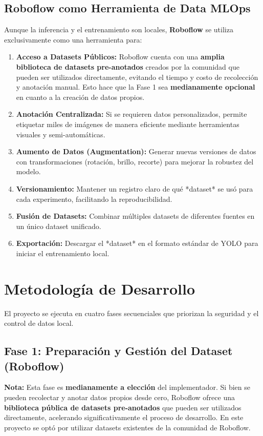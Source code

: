 \documentclass[12pt, a4paper]{article}
\begin{document}
\subsection{Roboflow como Herramienta de Data MLOps}
Aunque la inferencia y el entrenamiento son locales, \textbf{Roboflow} se utiliza exclusivamente como una herramienta para:
\begin{enumerate}
\item \textbf{Acceso a Datasets Públicos:} Roboflow cuenta con una \textbf{amplia biblioteca de datasets pre-anotados} creados por la comunidad que pueden ser utilizados directamente, evitando el tiempo y costo de recolección y anotación manual. Esto hace que la Fase 1 sea \textbf{medianamente opcional} en cuanto a la creación de datos propios.
\item \textbf{Anotación Centralizada:} Si se requieren datos personalizados, permite etiquetar miles de imágenes de manera eficiente mediante herramientas visuales y semi-automáticas.
\item \textbf{Aumento de Datos (Augmentation):} Generar nuevas versiones de datos con transformaciones (rotación, brillo, recorte) para mejorar la robustez del modelo.
\item \textbf{Versionamiento:} Mantener un registro claro de qué *dataset* se usó para cada experimento, facilitando la reproducibilidad.
\item \textbf{Fusión de Datasets:} Combinar múltiples datasets de diferentes fuentes en un único dataset unificado.
\item \textbf{Exportación:} Descargar el *dataset* en el formato estándar de YOLO para iniciar el entrenamiento local.
\end{enumerate}

\newpage

\section{Metodología de Desarrollo}

El proyecto se ejecuta en cuatro fases secuenciales que priorizan la seguridad y el control de datos local.

\subsection{Fase 1: Preparación y Gestión del Dataset (Roboflow)}

\textbf{Nota:} Esta fase es \textbf{medianamente a elección} del implementador. Si bien se pueden recolectar y anotar datos propios desde cero, Roboflow ofrece una \textbf{biblioteca pública de datasets pre-anotados} que pueden ser utilizados directamente, acelerando significativamente el proceso de desarrollo. En este proyecto se optó por utilizar datasets existentes de la comunidad de Roboflow.
\end{document}
